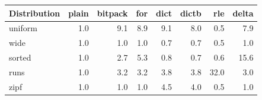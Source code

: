 \begin{tabular}{lrrrrrrr}
\toprule
Distribution & plain & bitpack & for & dict & dictb & rle & delta \\
\midrule
uniform & 1.0 & 9.1 & 8.9 & 9.1 & 8.0 & 0.5 & 7.9 \\
wide & 1.0 & 1.0 & 1.0 & 0.7 & 0.7 & 0.5 & 1.0 \\
sorted & 1.0 & 2.7 & 5.3 & 0.8 & 0.7 & 0.6 & 15.6 \\
runs & 1.0 & 3.2 & 3.2 & 3.8 & 3.8 & 32.0 & 3.0 \\
zipf & 1.0 & 1.0 & 1.0 & 4.5 & 4.0 & 0.5 & 1.0 \\
\bottomrule
\end{tabular}
